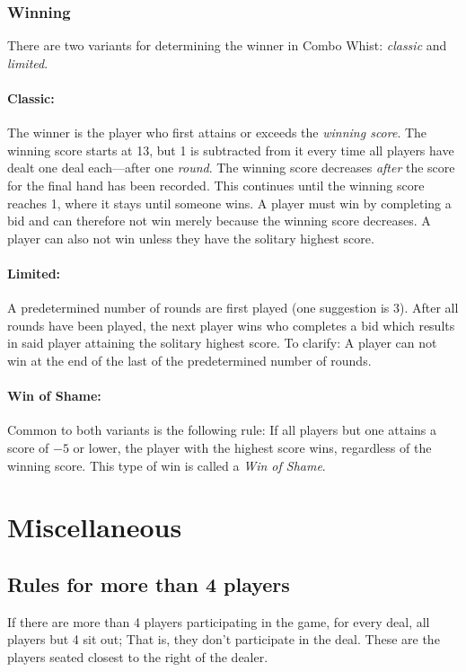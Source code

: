 \documentclass[a4paper]{article} %
\begin{document}
	\subsubsection{Winning}
	\label{sec:winning}
	There are two variants for determining the winner in Combo Whist: \emph{classic} and \emph{limited}.

	\paragraph{Classic:}
	The winner is the player who first attains or exceeds the \emph{winning score}. The winning score starts at 13, but 1 is subtracted from it every time all players have dealt one deal each---after one \emph{round}. The winning score decreases \emph{after} the score for the final hand has been recorded. This continues until the winning score reaches 1, where it stays until someone wins. A player must win by completing a bid and can therefore not win merely because the winning score decreases. A player can also not win unless they have the solitary highest score.

	\paragraph{Limited:}
	A predetermined number of rounds are first played (one suggestion is 3). After all rounds have been played, the next player wins who completes a bid which results in said player attaining the solitary highest score. To clarify: A player can not win at the end of the last of the predetermined number of rounds.

	\paragraph{Win of Shame:}
	Common to both variants is the following rule: If all players but one attains a score of $-5$ or lower, the player with the highest score wins, regardless of the winning score. This type of win is called a \emph{Win of Shame}.

	\section{Miscellaneous}
	\subsection{Rules for more than 4 players}
	If there are more than 4 players participating in the game, for every deal, all players but 4 sit out; That is, they don't participate in the deal. These are the players seated closest to the right of the dealer.
		
\end{document}
